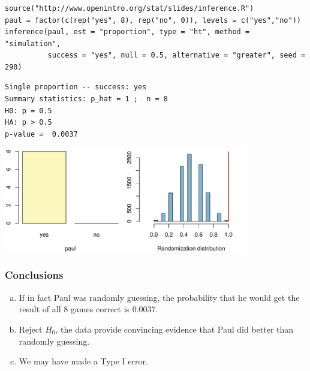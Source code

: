 \begin{frame}[fragile]
\frametitle{}

{\tiny
\begin{Verbatim}[frame=single, formatcom=\color{blue}]
source("http://www.openintro.org/stat/slides/inference.R")
paul = factor(c(rep("yes", 8), rep("no", 0)), levels = c("yes","no"))
inference(paul, est = "proportion", type = "ht", method = "simulation",
          success = "yes", null = 0.5, alternative = "greater", seed = 290)
\end{Verbatim}
}

\pause

{\tiny
\begin{Verbatim}[frame=single, formatcom=\color{gray}]
Single proportion -- success: yes 
Summary statistics: p_hat = 1 ;  n = 8 
H0: p = 0.5 
HA: p > 0.5 
p-value =  0.0037
\end{Verbatim}
}

\centering
\includegraphics[width=0.8\textwidth,height=0.4\textheight]{6-5_small_single_prop/figures/paul/paul_HT}

\end{frame}


\begin{frame}
\frametitle{Conclusions}


\begin{enumerate}[(a)]

\item If in fact Paul was randomly guessing, the probability that he would get the result of all 8 games correct is 0.0037.

\item Reject $H_0$, the data provide convincing evidence that Paul did better than randomly guessing.

\item We may have made a Type I error.


\end{enumerate}

\end{frame}

